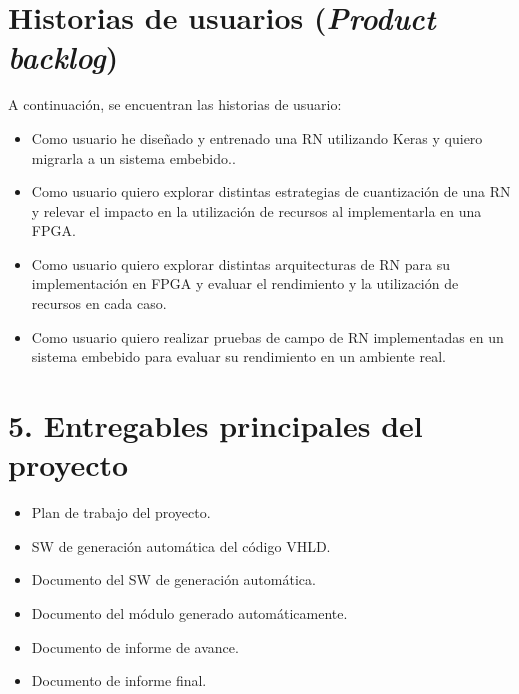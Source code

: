 \documentclass[11pt]{charter}
\begin{document}
\section*{Historias de usuarios (\textit{Product backlog})}
\label{sec:backlog}



A continuación, se encuentran las historias de usuario:

\begin{itemize}
	\item Como usuario he diseñado y entrenado una RN utilizando Keras y quiero migrarla a un sistema embebido.. %
	\item Como usuario quiero explorar distintas estrategias de cuantización de una RN y relevar el impacto en la utilización de recursos al implementarla en una FPGA. %
	\item Como usuario quiero explorar distintas arquitecturas de RN para su implementación en FPGA y evaluar el rendimiento y la utilización de recursos en cada caso. %
	\item Como usuario quiero realizar pruebas de campo de RN implementadas en un sistema embebido para evaluar su rendimiento en un ambiente real. %
\end{itemize}

\section*{5. Entregables principales del proyecto}
\label{sec:entregables}

\begin{itemize}
\item Plan de trabajo del proyecto.
\item SW de generación automática del código VHLD.
\item Documento del SW de generación automática.
\item Documento del módulo generado automáticamente.
\item Documento de informe de avance.
\item Documento de informe final.
\end{itemize}
\end{document}
